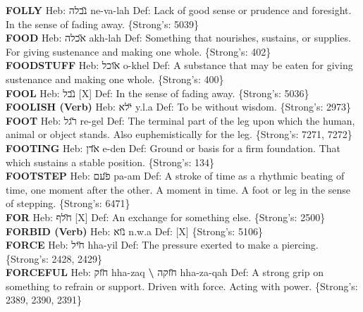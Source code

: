 {\textbf{FOLLY} Heb: {\large\H נבלה} ne-va-lah Def: Lack of good sense or prudence and foresight. In the sense of fading away. \{Strong's: 5039\}\hfill{}\\

\textbf{FOOD} Heb: {\large\H אכלה} akh-lah Def: Something that nourishes, sustains, or supplies. For giving sustenance and making one whole. \{Strong's: 402\}\hfill{}\\

\textbf{FOODSTUFF} Heb: {\large\H אוכל} o-khel Def: A substance that may be eaten for giving sustenance and making one whole. \{Strong's: 400\}\hfill{}\\

\textbf{FOOL} Heb: {\large\H נבל} {[}X{]} Def: In the sense of fading away. \{Strong's: 5036\}\hfill{}\\

\textbf{FOOLISH (Verb)} Heb: {\large\H ילא} y.l.a Def: To be without wisdom. \{Strong's: 2973\}\hfill{}\\

\textbf{FOOT} Heb: {\large\H רגל} re-gel Def: The terminal part of the leg upon which the human, animal or object stands. Also euphemistically for the leg. \{Strong's: 7271, 7272\}\hfill{}\\

\textbf{FOOTING} Heb: {\large\H אדן} e-den Def: Ground or basis for a firm foundation. That which sustains a stable position. \{Strong's: 134\}\hfill{}\\

\textbf{FOOTSTEP} Heb: {\large\H פעם} pa-am Def: A stroke of time as a rhythmic beating of time, one moment after the other. A moment in time. A foot or leg in the sense of stepping. \{Strong's: 6471\}\hfill{}\\

\textbf{FOR} Heb: {\large\H חלף} {[}X{]} Def: An exchange for something else. \{Strong's: 2500\}\hfill{}\\

\textbf{FORBID (Verb)} Heb: {\large\H נוא} n.w.a Def: {[}X{]} \{Strong's: 5106\}\hfill{}\\

\textbf{FORCE} Heb: {\large\H חיל} hha-yil Def: The pressure exerted to make a piercing. \{Strong's: 2428, 2429\}\hfill{}\\

\textbf{FORCEFUL} Heb: {\large\H חזק} hha-zaq \textbf{\textbackslash{}} {\large\H חזקה} hha-za-qah Def: A strong grip on something to refrain or support. Driven with force. Acting with power. \{Strong's: 2389, 2390, 2391\}\hfill{}\\

}
